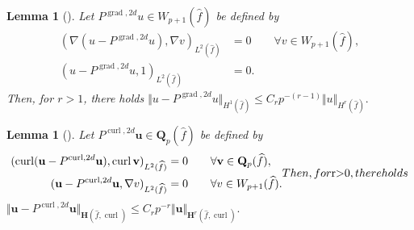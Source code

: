 \documentclass{article}
\newtheorem{lemma}[theorem]{Lemma}
\begin{document}
\begin{lemma}[\!\!]
\label{lemma:Pgrad2d}
Let $P^{\operatorname*{grad},2d}u\in W_{p+1}(\widehat{f})$ be defined by
\begin{subequations}
\label{eq:lemma:Pgrad2d}
\begin{align}
\label{eq:lemma:Pgrad2d-a}
(\nabla(u-P^{\operatorname*{grad},2d}u),\nabla v)_{L^2(\widehat{f})} &= 0 \qquad \forall v\in W_{p+1}(\widehat{f}),\\
(u-P^{\operatorname*{grad},2d}u,1)_{L^2(\widehat{f})} &= 0.
\label{eq:lemma:Pgrad2d-b}
\end{align}
\end{subequations}
Then, for $r>1$, there holds 
$\displaystyle 
\Vert u-P^{\operatorname*{grad},2d}u\Vert_{H^1(\widehat{f})} \leq C_r p^{-(r-1)} \Vert u\Vert_{H^r(\widehat{f})}.
$
\end{lemma}


\begin{lemma}[\!\!]
\label{lemma:Pcurl2d} Let $P^{\operatorname*{curl},2d}{\mathbf{u}}\in\mathbf{Q}_p(\widehat{f})$ be defined by 
\begin{subequations}
\label{eq:lemma:Pcurl2d-a}%
\begin{align}
(\operatorname{curl}({\mathbf{u}}-P^{\operatorname*{curl},2d}{\mathbf{u}%
}),\operatorname{curl}{\mathbf{v}})_{L^{2}(\widehat{f})}  &  =0\qquad\forall
{\mathbf{v}}\in\mathbf{Q}_p(\widehat{f}),\\
({\mathbf{u}}-P^{\operatorname*{curl},2d}{\mathbf{u}},\nabla v)_{L^{2}(\widehat{f})}
&  =0\qquad\forall v\in W_{p+1}(\widehat{f}).
\end{align}
Then, for $r>0$, there holds 
\end{subequations}
$\displaystyle \Vert{\mathbf{u}}-P^{\operatorname*{curl},2d}{\mathbf{u}}\Vert_{{\mathbf{H}%
}(\widehat{f},\operatorname{curl})}\leq C_r p^{-r}\Vert{\mathbf{u}}\Vert_{{\mathbf{H}%
}^{r}(\widehat{f},\operatorname{curl})}.
$
\end{lemma}

\end{document}

